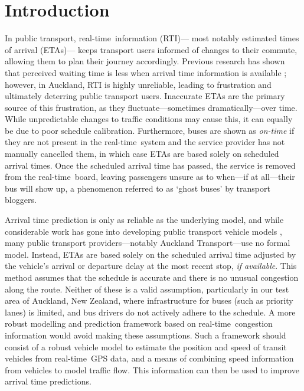 \documentclass[times, doublespace]{anzsauth}
\newcommand{\rt}{real-time\ }
\begin{document}
\section{Introduction}
\label{sec:intro}


In public transport, \rt information (RTI)---%
most notably estimated times of arrival (ETAs)---%
keeps transport users informed of changes to their commute,
allowing them to plan their journey accordingly.
Previous research has shown that perceived waiting time is less
when arrival time information is available \citep{TCRP_2003b};
however, in Auckland, RTI is highly unreliable,
leading to frustration and ultimately deterring public transport users.
Inaccurate ETAs are the primary source of this frustration,
as they fluctuate---sometimes dramatically---over time.
While unpredictable changes to traffic conditions may cause this,
it can equally be due to poor schedule calibration.
Furthermore, buses are shown as \emph{on-time}
if they are not present in the \rt system and
the service provider has not manually cancelled them,
in which case ETAs are based solely on scheduled arrival times.
Once the scheduled arrival time has passed,
the service is removed from the \rt board,
leaving passengers unsure as to when---if at all---their bus will show up,
a phenomenon referred to as `ghost buses' by transport bloggers.


Arrival time prediction is only as reliable as the underlying model,
and while considerable work has gone into developing public transport vehicle models
\citep{Cathey_2003,Jeong_2005,Yu_2011,Hans_2015},
many public transport providers---notably Auckland Transport---use no formal model.
Instead, ETAs are based solely on the scheduled arrival time
adjusted by the vehicle's arrival or departure delay at the most recent stop,
\emph{if available}.
This method assumes that the schedule is accurate
and there is no unusual congestion along the route.
Neither of these is a valid assumption,
particularly in our test area of Auckland, New Zealand,
where infrastructure for buses (such as priority lanes) is limited,
and bus drivers do not actively adhere to the schedule.
A more robust modelling and prediction framework
based on \rt congestion information would avoid making these assumptions.
Such a framework should consist of a robust vehicle model to estimate the position and speed
of transit vehicles from \rt GPS data,
and a means of combining speed information from vehicles
to model traffic flow.
This information can then be used to improve arrival time predictions.
\end{document}
